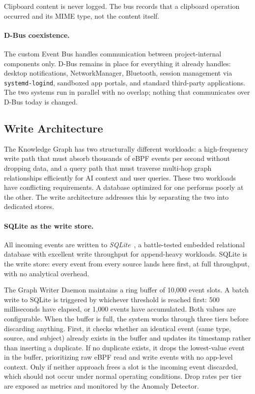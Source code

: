 Clipboard content is never logged. The bus records that a clipboard operation
occurred and its MIME type, not the content itself.

\paragraph{D-Bus coexistence.}
The custom Event Bus handles communication between project-internal components
only. D-Bus remains in place for everything it already handles: desktop
notifications, NetworkManager, Bluetooth, session management via
\texttt{systemd-logind}, sandboxed app portals, and standard third-party
applications. The two systems run in parallel with no overlap; nothing that
communicates over D-Bus today is changed.

\subsection{Write Architecture}
\label{sec:backpressure}

The Knowledge Graph has two structurally different workloads: a high-frequency
write path that must absorb thousands of eBPF events per second without
dropping data, and a query path that must traverse multi-hop graph
relationships efficiently for AI context and user queries. These two workloads
have conflicting requirements. A database optimized for one performs poorly at
the other. The write architecture addresses this by separating the two into
dedicated stores.

\paragraph{SQLite as the write store.}
All incoming events are written to \emph{SQLite}~\cite{sqlite}, a
battle-tested embedded relational database with excellent write throughput for
append-heavy workloads. SQLite is the write store: every event from every
source lands here first, at full throughput, with no analytical overhead.

The Graph Writer Daemon maintains a ring buffer of 10,000 event slots. A
batch write to SQLite is triggered by whichever threshold is reached first:
500 milliseconds have elapsed, or 1,000 events have accumulated. Both values
are configurable. When the buffer is full, the system works through three tiers
before discarding anything. First, it checks whether an identical event (same
type, source, and subject) already exists in the buffer and updates its
timestamp rather than inserting a duplicate. If no duplicate exists, it drops
the lowest-value event in the buffer, prioritizing raw eBPF read and write
events with no app-level context. Only if neither approach frees a slot is the
incoming event discarded, which should not occur under normal operating
conditions. Drop rates per tier are exposed as metrics and monitored by the
Anomaly Detector.

